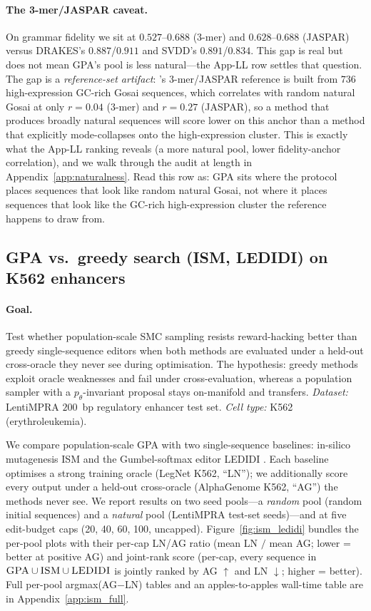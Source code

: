 \documentclass{article}
\theoremstyle{definition}
\theoremstyle{remark}
\newcommand{\gpa}{\textsc{GPA}\xspace}
\newcommand{\drakes}{\textsc{DRAKES}\xspace}
\newcommand{\svdd}{\textsc{SVDD}\xspace}
\newcommand{\ism}{\textsc{ISM}\xspace}
\newcommand{\ledidi}{\textsc{LEDIDI}\xspace}
\begin{document}
\paragraph{The 3-mer/JASPAR caveat.}
On grammar fidelity we sit at $0.527$--$0.688$ (3-mer) and $0.628$--$0.688$ (JASPAR) versus \drakes{}'s $0.887$/$0.911$ and \svdd{}'s $0.891$/$0.834$. This gap is real but does not mean \gpa{}'s pool is less natural---the App-LL row settles that question. The gap is a \emph{reference-set artifact}: \citet{paniouli2025}'s 3-mer/JASPAR reference is built from $736$ high-expression GC-rich Gosai sequences, which correlates with random natural Gosai at only $r\!=\!0.04$ (3-mer) and $r\!=\!0.27$ (JASPAR), so a method that produces broadly natural sequences will score lower on this anchor than a method that explicitly mode-collapses onto the high-expression cluster. This is exactly what the App-LL ranking reveals (a more natural pool, lower fidelity-anchor correlation), and we walk through the audit at length in Appendix~\ref{app:naturalness}. Read this row as: \gpa{} sits where the protocol places sequences that look like random natural Gosai, not where it places sequences that look like the GC-rich high-expression cluster the reference happens to draw from.

\subsection{GPA vs.\ greedy search (\ism, \ledidi) on K562 enhancers}\label{sec:results:ism}

\paragraph{Goal.}
Test whether population-scale SMC sampling resists reward-hacking better than greedy single-sequence editors when both methods are evaluated under a held-out cross-oracle they never see during optimisation. The hypothesis: greedy methods exploit oracle weaknesses and fail under cross-evaluation, whereas a population sampler with a $p_\theta$-invariant proposal stays on-manifold and transfers. \emph{Dataset:} LentiMPRA $200$~bp regulatory enhancer test set. \emph{Cell type:} K562 (erythroleukemia).

We compare population-scale \gpa{} with two single-sequence baselines: in-silico mutagenesis \ism{} \citep{ism2018} and the Gumbel-softmax editor \ledidi{} \citep{ledidi2020}. Each baseline optimises a strong training oracle (LegNet K562, ``LN''); we additionally score every output under a held-out cross-oracle (AlphaGenome K562, ``AG'') the methods never see. We report results on two seed pools---a \emph{random} pool (random initial sequences) and a \emph{natural} pool (LentiMPRA test-set seeds)---and at five edit-budget caps (20, 40, 60, 100, uncapped). Figure~\ref{fig:ism_ledidi} bundles the per-pool plots with their per-cap LN/AG ratio (mean LN $/$ mean AG; lower = better at positive AG) and joint-rank score (per-cap, every sequence in $\gpa\cup\ism\cup\ledidi$ is jointly ranked by AG $\uparrow$ and LN $\downarrow$; higher = better). Full per-pool argmax(AG$-$LN) tables and an apples-to-apples wall-time table are in Appendix~\ref{app:ism_full}.
\end{document}
